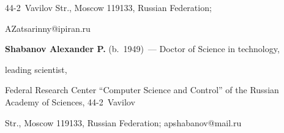 44-2~Vavilov Str., Moscow 119133, Russian Federation; 

\mbox{AZatsarinny@ipiran.ru}

  

  \vspace*{3pt}

  

  \noindent

  \textbf{Shabanov Alexander P.} (b.\ 1949)~--- Doctor of Science in technology, 

leading scientist, %

Federal Research Center ``Computer Science and Control'' of the Russian Academy of Sciences, 44-2~Vavilov 

Str., Moscow 119133, Russian Federation; \mbox{apshabanov@mail.ru}

  







\label{end\stat}



\renewcommand{\bibname}{\protect\rm Литература}    

  

